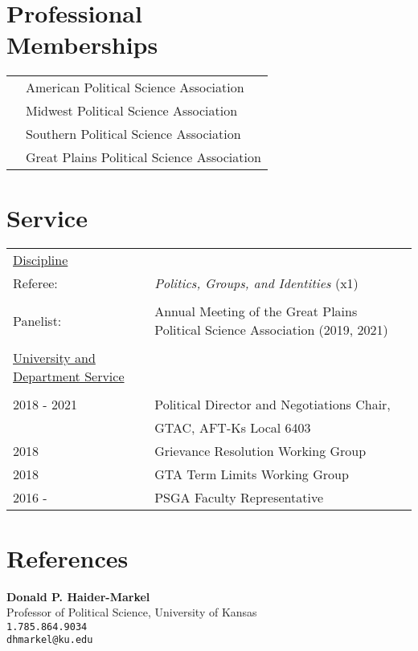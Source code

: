\documentclass[margin,line,pifont,palatino,courier]{res}
\begin{document}
\begin{resume}


\section{\sc Professional\\ Memberships}

\begin{tabular}{@{}p{0.8in}p{4in}}

  & American Political Science Association\\
  & Midwest Political Science Association\\
  & Southern Political Science Association\\
  & Great Plains Political Science Association\\
\end{tabular}


\section{\sc Service}

\begin{tabular}{@{}p{0.8in}p{4in}}
  \\
  \underline{Discipline} &\\
  Referee: & \textit{Politics, Groups, and Identities} (x1) \\
  \\
  Panelist: & Annual Meeting of the Great Plains Political
                         Science Association (2019, 2021)\\
  \\
  \underline{University and Department Service} &\\
  \\
  2018 - 2021 & Political Director and Negotiations Chair,\\
              &  GTAC, AFT-Ks Local 6403 \\
  2018 & Grievance Resolution Working Group \\
  2018 & GTA Term Limits Working Group\\
  2016 - & PSGA Faculty Representative\\
\end{tabular}


\newpage

\section{\sc References}

\textbf{Donald P. Haider-Markel} \\
Professor of Political Science, University of Kansas \\
\verb+1.785.864.9034+\\
\texttt{dhmarkel@ku.edu}


\end{resume}
\end{document}
